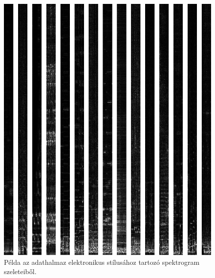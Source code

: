 \begin{figure}[p]
    \includegraphics[height=0.80\paperheight]{src/images/example_slices_electronic.png}
    \caption{Példa az adathalmaz elektronikus stílusához tartozó spektrogram szeleteiből.}
\end{figure}

